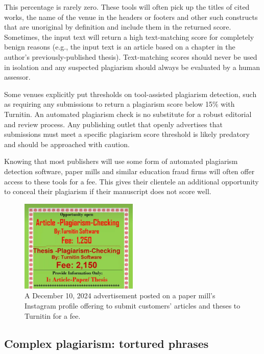 \documentclass[letterpaper, 12pt]{article}
\begin{document}
This percentage is rarely zero. These tools will often pick up the titles of cited works, the name of the venue in the headers or footers and other such constructs that are unoriginal by definition and include them in the returned score. Sometimes, the input text will return a high text-matching score for completely benign reasons (e.g., the input text is an article based on a chapter in the author's previously-published thesis). Text-matching scores should never be used in isolation and any suspected plagiarism should always be evaluated by a human assessor.

Some venues explicitly put thresholds on tool-assisted plagiarism detection, such as requiring any submissions to return a plagiarism score below 15\% with Turnitin. An automated plagiarism check is no substitute for a robust editorial and review process. Any publishing outlet that openly advertises that submissions must meet a specific plagiarism score threshold is likely predatory and should be approached with caution.

Knowing that most publishers will use some form of automated plagiarism detection software, paper mills and similar education fraud firms will often offer access to these tools for a fee. This gives their clientele an additional opportunity to conceal their plagiarism if their manuscript does not score well.

\begin{figure}[h!tbp]
    \centering
    \includegraphics[width=0.5\textwidth]{img/plagiarism/Screenshot_20250328_132930_Instagram.jpg}
    \caption*{A December 10, 2024 advertisement posted on a paper mill's Instagram profile offering to submit customers' articles and theses to Turnitin for a fee.}
\end{figure}

\subsection*{Complex plagiarism: tortured phrases}
\end{document}
